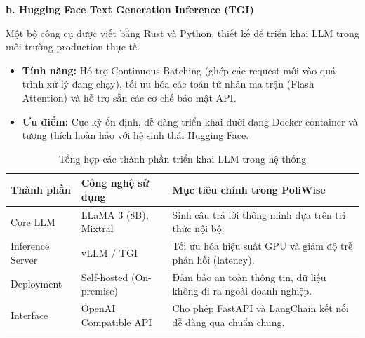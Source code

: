 \documentclass[12pt,a4paper]{report}
\begin{document}
\textbf{b. Hugging Face Text Generation Inference (TGI)}

Một bộ công cụ được viết bằng Rust và Python, thiết kế để triển khai LLM trong môi trường production thực tế.
\begin{itemize}
    \item \textbf{Tính năng:} Hỗ trợ Continuous Batching (ghép các request mới vào quá trình xử lý đang chạy), tối ưu hóa các toán tử nhân ma trận (Flash Attention) và hỗ trợ sẵn các cơ chế bảo mật API.
    \item \textbf{Ưu điểm:} Cực kỳ ổn định, dễ dàng triển khai dưới dạng Docker container và tương thích hoàn hảo với hệ sinh thái Hugging Face.
\end{itemize}

\begin{table}[H]
\centering
\caption{Tổng hợp các thành phần triển khai LLM trong hệ thống}
\label{tab:llm_serving_components}
\begin{tabularx}{\textwidth}{|l|l|X|}
\hline
\textbf{Thành phần} & \textbf{Công nghệ sử dụng} & \textbf{Mục tiêu chính trong PoliWise} \\ \hline
Core LLM & LLaMA 3 (8B), Mixtral & Sinh câu trả lời thông minh dựa trên tri thức nội bộ. \\ \hline
Inference Server & vLLM / TGI & Tối ưu hóa hiệu suất GPU và giảm độ trễ phản hồi (latency). \\ \hline
Deployment & Self-hosted (On-premise) & Đảm bảo an toàn thông tin, dữ liệu không đi ra ngoài doanh nghiệp. \\ \hline
Interface & OpenAI Compatible API & Cho phép FastAPI và LangChain kết nối dễ dàng qua chuẩn chung. \\ \hline
\end{tabularx}
\end{table}
\end{document}
